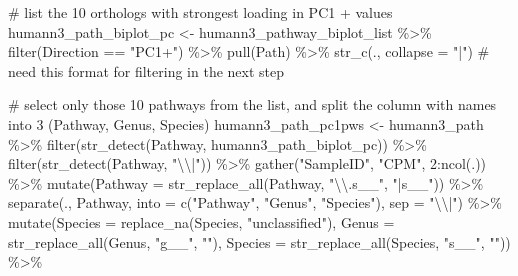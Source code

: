 \documentclass[
  letterpaper,
]{book}
\newenvironment{Shaded}{}{}
\newcommand{\AttributeTok}[1]{\textcolor[rgb]{0.84,0.23,0.29}{#1}}
\newcommand{\CommentTok}[1]{\textcolor[rgb]{0.42,0.45,0.49}{#1}}
\newcommand{\DecValTok}[1]{\textcolor[rgb]{0.00,0.36,0.77}{#1}}
\newcommand{\FunctionTok}[1]{\textcolor[rgb]{0.44,0.26,0.76}{#1}}
\newcommand{\NormalTok}[1]{\textcolor[rgb]{0.14,0.16,0.18}{#1}}
\newcommand{\OtherTok}[1]{\textcolor[rgb]{0.44,0.26,0.76}{#1}}
\newcommand{\SpecialCharTok}[1]{\textcolor[rgb]{0.00,0.36,0.77}{#1}}
\newcommand{\StringTok}[1]{\textcolor[rgb]{0.01,0.18,0.38}{#1}}
\begin{document}
\begin{Shaded}
\begin{Highlighting}[]
\CommentTok{\# list the 10 orthologs with strongest loading in PC1 + values}
\NormalTok{humann3\_path\_biplot\_pc }\OtherTok{\textless{}{-}}\NormalTok{ humann3\_pathway\_biplot\_list }\SpecialCharTok{\%\textgreater{}\%}
  \FunctionTok{filter}\NormalTok{(Direction }\SpecialCharTok{==} \StringTok{"PC1+"}\NormalTok{) }\SpecialCharTok{\%\textgreater{}\%}
  \FunctionTok{pull}\NormalTok{(Path) }\SpecialCharTok{\%\textgreater{}\%}
  \FunctionTok{str\_c}\NormalTok{(., }\AttributeTok{collapse =} \StringTok{"|"}\NormalTok{) }\CommentTok{\# need this format for filtering in the next step}


\CommentTok{\# select only those 10 pathways from the list, and split the column with names into 3 (Pathway, Genus, Species)}
\NormalTok{humann3\_path\_pc1pws }\OtherTok{\textless{}{-}}\NormalTok{ humann3\_path }\SpecialCharTok{\%\textgreater{}\%}
  \FunctionTok{filter}\NormalTok{(}\FunctionTok{str\_detect}\NormalTok{(Pathway, humann3\_path\_biplot\_pc)) }\SpecialCharTok{\%\textgreater{}\%}
  \FunctionTok{filter}\NormalTok{(}\FunctionTok{str\_detect}\NormalTok{(Pathway, }\StringTok{"}\SpecialCharTok{\textbackslash{}\textbackslash{}}\StringTok{|"}\NormalTok{)) }\SpecialCharTok{\%\textgreater{}\%}
  \FunctionTok{gather}\NormalTok{(}\StringTok{"SampleID"}\NormalTok{, }\StringTok{"CPM"}\NormalTok{, }\DecValTok{2}\SpecialCharTok{:}\FunctionTok{ncol}\NormalTok{(.)) }\SpecialCharTok{\%\textgreater{}\%}
  \FunctionTok{mutate}\NormalTok{(}\AttributeTok{Pathway =} \FunctionTok{str\_replace\_all}\NormalTok{(Pathway, }\StringTok{"}\SpecialCharTok{\textbackslash{}\textbackslash{}}\StringTok{.s\_\_"}\NormalTok{, }\StringTok{"|s\_\_"}\NormalTok{)) }\SpecialCharTok{\%\textgreater{}\%}
  \FunctionTok{separate}\NormalTok{(., Pathway, }\AttributeTok{into =} \FunctionTok{c}\NormalTok{(}\StringTok{"Pathway"}\NormalTok{, }\StringTok{"Genus"}\NormalTok{, }\StringTok{"Species"}\NormalTok{), }\AttributeTok{sep =} \StringTok{"}\SpecialCharTok{\textbackslash{}\textbackslash{}}\StringTok{|"}\NormalTok{) }\SpecialCharTok{\%\textgreater{}\%}
  \FunctionTok{mutate}\NormalTok{(}\AttributeTok{Species =} \FunctionTok{replace\_na}\NormalTok{(Species, }\StringTok{"unclassified"}\NormalTok{),}
         \AttributeTok{Genus =} \FunctionTok{str\_replace\_all}\NormalTok{(Genus, }\StringTok{"g\_\_"}\NormalTok{, }\StringTok{""}\NormalTok{),}
         \AttributeTok{Species =} \FunctionTok{str\_replace\_all}\NormalTok{(Species, }\StringTok{"s\_\_"}\NormalTok{, }\StringTok{""}\NormalTok{)) }\SpecialCharTok{\%\textgreater{}\%}

\end{Highlighting}
\end{Shaded}
\end{document}
